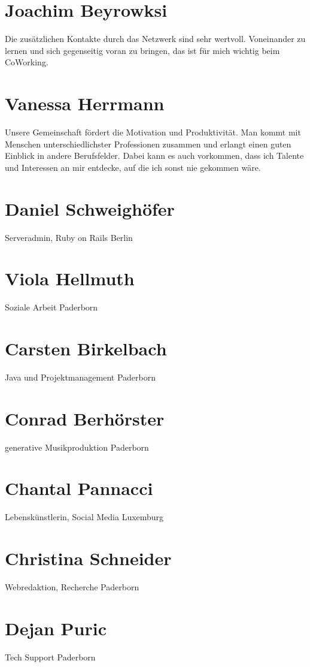 \begin{appendix}
  \section{Joachim Beyrowksi}
\glqq Die zusätzlichen Kontakte durch das Netzwerk sind sehr wertvoll. Voneinander zu lernen und sich gegenseitig voran zu bringen, das ist für mich wichtig beim CoWorking. \grqq
  \section{Vanessa Herrmann}
\glqq Unsere Gemeinschaft fördert die Motivation und Produktivität. Man kommt mit Menschen unterschiedlichster Professionen zusammen und erlangt einen guten Einblick in andere Berufsfelder. Dabei kann es auch vorkommen, dass ich Talente und Interessen an mir entdecke, auf die ich sonst nie gekommen wäre. \grqq

\section{Daniel Schweighöfer}
Serveradmin, Ruby on Rails
Berlin

\section{Viola Hellmuth}
Soziale Arbeit
Paderborn

\section{Carsten Birkelbach}
Java und Projektmanagement
Paderborn

\section{Conrad Berhörster}
generative Musikproduktion
Paderborn

\section{Chantal Pannacci}
Lebenskünstlerin, Social Media
Luxemburg

\section{Christina Schneider}
Webredaktion, Recherche
Paderborn

\section{Dejan Puric}
Tech Support
Paderborn


\end{appendix}
